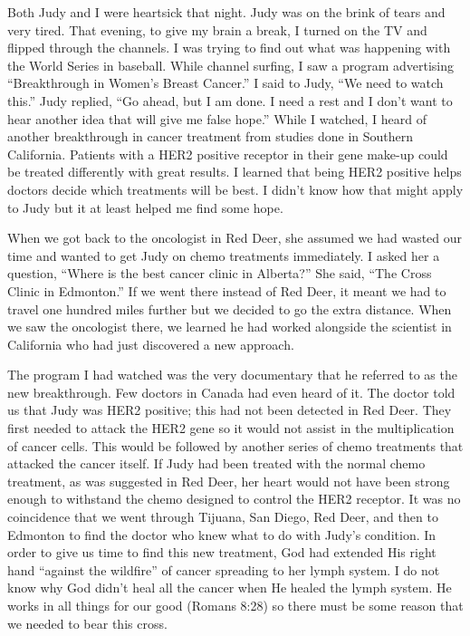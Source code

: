 \documentclass[twoside, 12pt]{book}
\begin{document}
Both Judy and I were heartsick that night. Judy was on the brink of tears and very tired. That evening, to give my brain a break, I turned on the TV and flipped through the channels. I was trying to find out what was happening with the World Series in baseball. While channel surfing, I saw a program advertising “Breakthrough in Women’s Breast Cancer.” I said to Judy, “We need to watch this.” Judy replied, “Go ahead, but I am done. I need a rest and I don’t want to hear another idea that will give me false hope.”  While I watched, I heard of another breakthrough in cancer treatment from studies done in Southern California. Patients with a HER2 positive receptor in their gene make-up could be treated differently with great results. I learned that being HER2 positive helps doctors decide which treatments will be best. I didn’t know how that might apply to Judy but it at least helped me find some hope.

When we got back to the oncologist in Red Deer, she assumed we had wasted our time and wanted to get Judy on chemo treatments immediately. I asked her a question, “Where is the best cancer clinic in Alberta?” She said, “The Cross Clinic in Edmonton.” If we went there instead of Red Deer, it meant we had to travel one hundred miles further but we decided to go the extra distance. When we saw the oncologist there, we learned he had worked alongside the scientist in California who had just discovered a new approach.

The program I had watched was the very documentary that he referred to as the new breakthrough. Few doctors in Canada had even heard of it. The doctor told us that Judy was HER2 positive; this had not been detected in Red Deer. They first needed to attack the HER2 gene so it would not assist in the multiplication of cancer cells. This would be followed by another series of chemo treatments that attacked the cancer itself. If Judy had been treated with the normal chemo treatment, as was suggested in Red Deer, her heart would not have been strong enough to withstand the chemo designed to control the HER2 receptor. It was no coincidence that we went through Tijuana, San Diego, Red Deer, and then to Edmonton to find the doctor who knew what to do with Judy’s condition. In order to give us time to find this new treatment, God had extended His right hand “against the wildfire” of cancer spreading to her lymph system. I do not know why God didn’t heal all the cancer when He healed the lymph system. He works in all things for our good (Romans 8:28) so there must be some reason that we needed to bear this cross.
\end{document}
